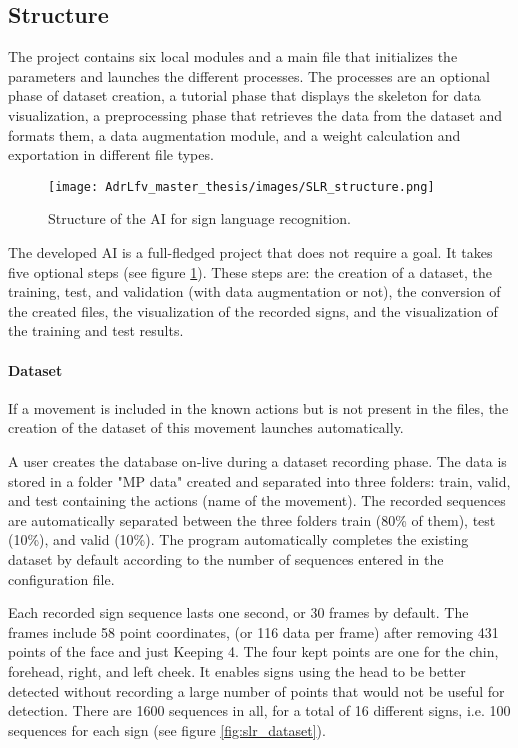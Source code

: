 \subsection{Structure}

The project contains six local modules and a main file that initializes the parameters and launches the different processes. The processes are an optional phase of dataset creation, a tutorial phase that displays the skeleton for data visualization, a preprocessing phase that retrieves the data from the dataset and formats them, a data augmentation module, and a weight calculation and exportation in different file types.

\begin{figure}[h]
    \centering
    \texttt{[image: AdrLfv\_master\_thesis/images/SLR\_structure.png]}
    \caption{Structure of the AI for sign language recognition.}
    \label{fig:SLR_structure}
\end{figure}

The developed AI is a full-fledged project that does not require a goal. It takes five optional steps (see figure \ref{fig:SLR_structure}). These steps are: the creation of a dataset, the training, test, and validation (with data augmentation or not), the conversion of the created files, the visualization of the recorded signs, and the visualization of the training and test results.

\paragraph{Dataset}

If a movement is included in the known actions but is not present in the files, the creation of the dataset of this movement launches automatically. 

A user creates the database on-live during a dataset recording phase. The data is stored in a folder "MP data" created and separated into three folders: train, valid, and test containing the actions (name of the movement). The recorded sequences are automatically separated between the three folders train (80\% of them), test (10\%), and valid (10\%). The program automatically completes the existing dataset by default according to the number of sequences entered in the configuration file.




Each recorded sign sequence lasts one second, or 30 frames by default. The frames include 58 point coordinates, (or 116 data per frame) after removing 431 points of the face and just Keeping 4. The four kept points are one for the chin, forehead, right, and left cheek. It enables signs using the head to be better detected without recording a large number of points that would not be useful for detection. There are 1600 sequences in all, for a total of 16 different signs, i.e. 100 sequences for each sign (see figure \ref{fig:slr_dataset}).

